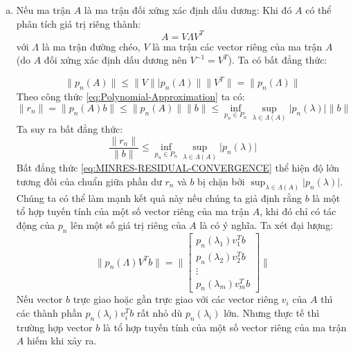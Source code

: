 \documentclass[14pt, a4paper]{article}
\numberwithin{equation}{section}
\numberwithin{algorithm}{section}
\numberwithin{figure}{section}
\numberwithin{dl}{section}
\numberwithin{md}{section}
\numberwithin{bd}{section}
\numberwithin{dn}{section}
\begin{document}
\begin{enumerate}[a)] %
    \item Nếu ma trận $A$ là ma trận đối xứng xác định dấu dương:
    Khi đó $A$ có thể phân tích giá trị riêng thành:
    \begin{equation}
        A = V \Lambda V^T
    \end{equation}
    với $\Lambda$ là ma trận đường chéo, $V$ là ma trận các vector riêng của ma trận $A$ (do $A$ đối xứng xác định dấu dương nên $V^{-1}=V^T$). Ta có bất đẳng thức:

    \begin{equation}
        \lVert p_n(A) \rVert \leq \lVert V \rVert \lvert p_n(\Lambda) \rVert \lVert V^T \rVert = \lVert p_n(\Lambda) \rVert
    \end{equation}
    Theo công thức \ref{eq:Polynomial-Approximation} ta có:
    \begin{equation}
        \lVert r_n \rVert = \lVert p_n(A)b \rVert \leq \lVert p_n(A) \rVert \lVert b \rVert \leq \inf_{p_n \in P_n} \sup_{\lambda \in \Lambda(A)} \lvert p_n(\lambda) \rvert \lVert b \rVert
    \end{equation}
    Ta suy ra bất đẳng thức:
    \begin{equation} \label{eq:MINRES-RESIDUAL-CONVERGENCE}
        \dfrac{\lVert r_n \rVert}{\lVert b \rVert} \leq \inf_{p_n \in P_n} \sup_{\lambda \in \Lambda(A)} \lvert p_n(\lambda) \rvert
    \end{equation}
    Bất đẳng thức \ref{eq:MINRES-RESIDUAL-CONVERGENCE} thể hiện độ lớn tương đối của chuẩn giữa phần dư $r_n$ và $b$ bị chặn bởi $\sup_{\lambda \in \Lambda(A)} \lvert p_n(\lambda) \rvert$. Chúng ta có thể làm mạnh kết quả này nếu chúng ta giả định rằng $b$ là một tổ hợp tuyến tính của một số vector riêng của ma trận $A$, khi đó chỉ có tác động của $p_n$ lên một số giá trị riêng của $A$ là có ý nghĩa.
    Ta xét đại lượng:
    \begin{equation}
        \lVert p_n(\Lambda) V^T b \rVert = \Biggl\lVert \begin{bmatrix} p_n(\lambda_1) v_1^T b \\ p_n(\lambda_2) v_2^T b \\ \vdots \\ p_n(\lambda_m) v_m^T b\end{bmatrix} \Biggl\rVert
    \end{equation}
    Nếu vector $b$ trực giao hoặc gần trực giao với các vector riêng $v_i$ của $A$ thì các thành phần $p_n(\lambda_i)v_i^T b$ rất nhỏ dù $p_n(\lambda_i)$ lớn. Nhưng thực tế thì trường hợp vector $b$ là tổ hợp tuyến tính của một số vector riêng của ma trận $A$ hiếm khi xảy ra.

\end{enumerate}
\end{document}
